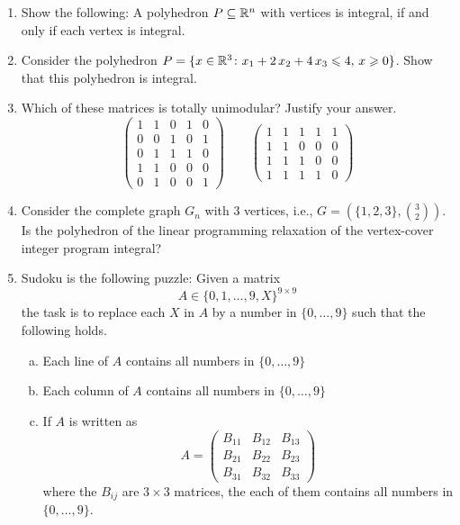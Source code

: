 \begin{enumerate}
\item Show the following: A polyhedron $P \subseteq\mathbb{R}^n$ with vertices is
  integral, if and only if each vertex is integral. \label{i:item:3}
\item Consider the polyhedron $P = \{ x \in \mathbb{R}^3 \colon x_1 + 2\,x_2 + 4\,
  x_3 \leqslant 4, \, x\geqslant0\}$. Show that this polyhedron is
  integral. \label{i:item:2}
\item Which of these matrices is totally unimodular? Justify your
  answer. \label{i:item:4}
  \begin{displaymath}
    \begin{pmatrix}
      1 & 1  & 0 &  1 & 0 \\
      0 & 0 &  1 &  0 &  1 \\
      0 & 1 &  1 &  1 & 0 \\
      1 & 1 &  0 &  0 & 0 \\
      0 & 1 &  0 &  0 & 1
    \end{pmatrix}
    \quad \quad 
    \begin{pmatrix}
      1&  1& 1& 1& 1 \\
      1& 1& 0& 0& 0\\
      1& 1& 1& 0& 0\\
      1&  1& 1& 1& 0
    \end{pmatrix}
  \end{displaymath}
\item Consider the complete graph $G_n$ with $3$ vertices, i.e., $G =
  (\{1,2,3\}, \binom{3}{2} )$. Is the polyhedron of the linear
  programming relaxation of the vertex-cover integer program integral?
  \label{i:item:5}


\item Sudoku is the following puzzle: Given a matrix
  \begin{displaymath}
    A ∈ \{0,1,\dots,9,X\}^{9 ×9} 
  \end{displaymath}
  the task is to replace each $X$ in $A$ by a number in $\{0,\dots,9\}$ such that the following holds.
  \begin{enumerate}[a)] 
  \item Each line of $A$ contains all numbers in  $\{0,\dots,9\}$
  \item Each column of $A$ contains all numbers in  $\{0,\dots,9\}$
  \item If $A$ is written as
    \begin{displaymath}
      A =
      \begin{pmatrix}
        B_{11} & B_{12} & B_{13} \\
        B_{21} & B_{22} & B_{23} \\
        B_{31} & B_{32} & B_{33} 
      \end{pmatrix}
    \end{displaymath}
    where the $B_{ij}$ are $3 ×3$ matrices, the each of them contains all numbers in  $\{0,\dots,9\}$.


\end{enumerate}
\end{enumerate}
